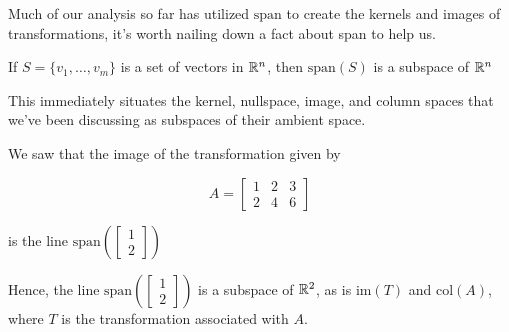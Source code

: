 \documentclass{ximera}
\begin{document}
Much of our analysis so far has utilized $\mbox{span}$ to create the kernels and images of transformations, it's worth nailing down a fact about span to help us.

\begin{theorem}

  If $S=\lbrace v_1, \ldots, v_m\rbrace$ is a set of vectors in $\mathbb{R}^n$, then $\mbox{span}(S)$ is a subspace of $\mathbb{R}^n$

\end{theorem}

This immediately situates the kernel, nullspace, image, and column spaces that we've been discussing as subspaces of their ambient space. 

\begin{example}

  We saw  that the image of the transformation given by 

  $$A=\begin{bmatrix}1&2&3\\2&4&6\end{bmatrix}$$

  is the line $\mbox{span}\left(\begin{bmatrix}1\\2\end{bmatrix}\right)$

  \begin{center}
\end{center}

Hence, the line $\mbox{span}\left(\begin{bmatrix}1\\2\end{bmatrix}\right)$ is a subspace of $\mathbb{R}^2$, as is $\mbox{im}(T)$ and $\mbox{col}(A)$, where $T$ is the transformation associated with $A$.

\end{example}
\end{document}
